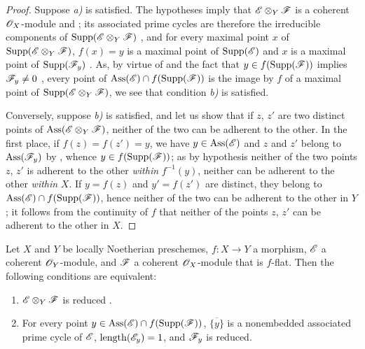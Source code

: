 \begin{proof}
Suppose \emph{a)} is satisfied.
The hypotheses imply that $\mathscr{E}\otimes_Y\mathscr{F}$ is a coherent $\mathscr{O}_X$-module  and ; its associated prime cycles are therefore the irreducible components of $\operatorname{Supp}(\mathscr{E}\otimes_Y\mathscr{F})$ , and for every maximal point $x$ of $\operatorname{Supp}(\mathscr{E}\otimes_Y\mathscr{F})$, $f(x)=y$ is a maximal point of $\operatorname{Supp}(\mathscr{E})$ and $x$ is a maximal point of $\operatorname{Supp}(\mathscr{F}_y)$ .
As, by virtue of  and the fact that $y\in f(\operatorname{Supp}(\mathscr{F}))$ implies $\mathscr{F}_y\neq 0$ , every point of $\operatorname{Ass}(\mathscr{E})\cap f(\operatorname{Supp}(\mathscr{F}))$ is the image by $f$ of a maximal point of $\operatorname{Supp}(\mathscr{E}\otimes_Y\mathscr{F})$, we see that condition \emph{b)} is satisfied.

Conversely, suppose \emph{b)} is satisfied, and let us show that if $z$, $z'$ are two distinct points of $\operatorname{Ass}(\mathscr{E}\otimes_Y\mathscr{F})$, neither of the two can be adherent to the other.
In the first place, if $f(z)=f(z')=y$, we have $y\in\operatorname{Ass}(\mathscr{E})$ and $z$ and $z'$ belong to $\operatorname{Ass}(\mathscr{F}_y)$ by , whence $y\in f(\operatorname{Supp}(\mathscr{F}))$; as by hypothesis neither of the two points $z$, $z'$ is adherent to the other \emph{within} $f^{-1}(y)$, neither can be adherent to the other \emph{within} $X$.
If $y=f(z)$ and $y'=f(z')$ are distinct, they belong to $\operatorname{Ass}(\mathscr{E})\cap f(\operatorname{Supp}(\mathscr{F}))$, hence neither of the two can be adherent to the other in $Y$; it follows from the continuity of $f$ that neither of the points $z$, $z'$ can be adherent to the other in $X$.
\end{proof}

\begin{proposition}[3.3.4]
\label{IV.3.3.4}
Let $X$ and $Y$ be locally Noetherian preschemes, $f:X\to Y$ a morphism, $\mathscr{E}$ a coherent $\mathscr{O}_Y$-module, and $\mathscr{F}$ a coherent $\mathscr{O}_X$-module that is $f$-flat.
Then the following conditions are equivalent:
\begin{enumerate}
  \item[\emph{a)}] $\mathscr{E}\otimes_Y\mathscr{F}$ is reduced .
  \item[\emph{b)}] For every point $y\in\operatorname{Ass}(\mathscr{E})\cap f(\operatorname{Supp}(\mathscr{F}))$, $\overline{\{y\}}$ is a nonembedded associated prime cycle of $\mathscr{E}$, $\operatorname{length}(\mathscr{E}_y)=1$, and $\mathscr{F}_y$ is reduced.
\end{enumerate}
\end{proposition}

